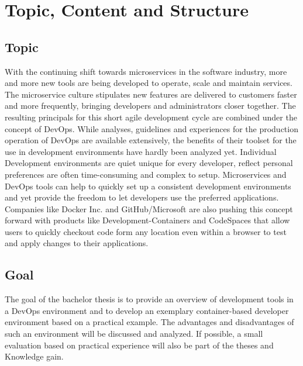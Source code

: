 \documentclass[12pt, a4paper]{article}
\begin{document}
\nocite{*}



\tableofcontents
\newpage
{}
\setcounter{lastroman}{\value{page}}

\pagestyle{plain}

\section{Topic, Content and Structure}
\subsection{Topic}
With the continuing shift towards microservices in the software industry, more and more new tools are being developed to operate, scale and maintain services. The microservice culture stipulates new features are delivered to customers faster and more frequently, bringing developers and administrators closer together. The resulting principals for this short agile development cycle are combined under the concept of DevOps. While analyses, guidelines and experiences for the production operation of DevOps are available extensively, the benefits of their toolset for the use in development environments have hardly been analyzed yet.\newline
Individual Development environments are quiet unique for every developer, reflect personal preferences are often time-consuming and complex to setup. Microservices and DevOps tools can help to quickly set up a consistent development environments and yet provide the freedom to let developers use the preferred applications. Companies like Docker Inc. and GitHub/Microsoft are also pushing this concept forward with products like Development-Containers and CodeSpaces that allow users to quickly checkout code form any location even within a browser to test and apply changes to their applications.
\subsection{Goal}
The goal of the bachelor thesis is to provide an overview of development tools in a DevOps environment and to develop an exemplary container-based developer environment based on a practical example. The advantages and disadvantages of such an environment will be discussed and analyzed. If possible, a small evaluation based on practical experience will also be part of the theses and Knowledge gain.
\end{document}
